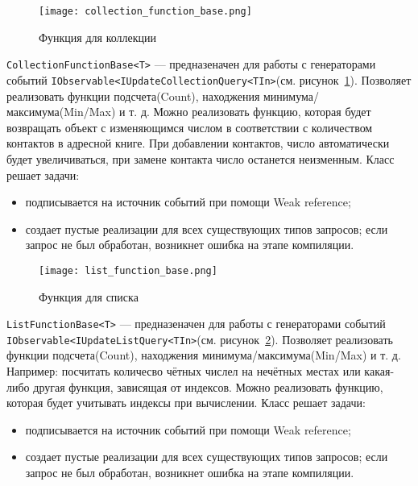 \begin{figure}[ht]
\centering
  \texttt{[image: collection\_function\_base.png]}
  \caption{ Функция для коллекции }
  \label{fig:collection_function_base}
\end{figure}

\lstinline[style=csharpinlinestyle]!CollectionFunctionBase<T>! --- предназеначен для работы с генераторами событий
\lstinline[style=csharpinlinestyle]!IObservable<IUpdateCollectionQuery<TIn>!(см. рисунок~\ref{fig:collection_function_base}).
Позволяет реализовать функции подсчета(Count), находжения минимума/максимума(Min/Max) и т. д.
Можно реализовать функцию, которая будет возвращать объект с изменяющимся числом в соответствии с количеством контактов в адресной книге.
При добавлении контактов, число автоматически будет увеличиваться, при замене контакта число останется неизменным.
Класс решает задачи:

\begin{itemize}
  \item подписывается на источник событий при помощи Weak reference;
  \item создает пустые реализации для всех существующих типов запросов; если запрос не был обработан, возникнет ошибка на этапе компиляции.
\end{itemize}

\begin{figure}[ht]
\centering
  \texttt{[image: list\_function\_base.png]}
  \caption{ Функция для списка }
  \label{fig:list_function_base}
\end{figure}

\lstinline[style=csharpinlinestyle]!ListFunctionBase<T>! --- предназеначен для работы с генераторами событий
\lstinline[style=csharpinlinestyle]!IObservable<IUpdateListQuery<TIn>!(см. рисунок~\ref{fig:list_function_base}).
Позволяет реализовать функции подсчета(Count), находжения минимума/максимума(Min/Max) и т. д. Например: посчитать количесво чётных числел на нечётных местах или какая-либо другая функция,
зависящая от индексов. Можно реализовать функцию, которая будет учитывать индексы при вычислении.
Класс решает задачи:

\begin{itemize}
  \item подписывается на источник событий при помощи Weak reference;
  \item создает пустые реализации для всех существующих типов запросов; если запрос не был обработан, возникнет ошибка на этапе компиляции.
\end{itemize}

